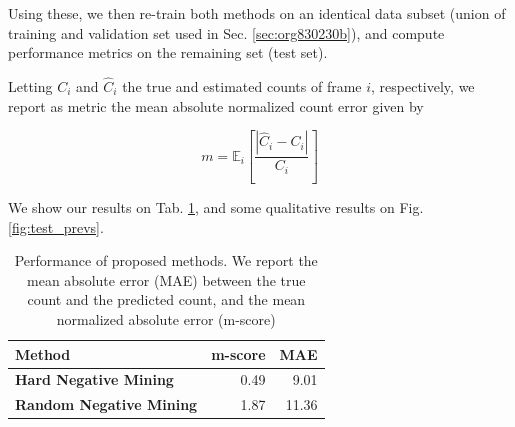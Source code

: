 \documentclass[11pt]{article}
\begin{document}
Using these, we then re-train both methods on an identical data subset (union of training and validation set used in Sec. \ref{sec:org830230b}), and compute performance metrics on the remaining set (test set).

Letting \(C_i\) and \(\hat{C}_i\) the true and estimated counts of frame \(i\), respectively, we report as metric the mean absolute normalized count error given by

\[
m = \mathbb{E}_i \left[ \frac{|\hat{C}_i - C_i|}{C_i} \right]
\]

We show our results on Tab. \ref{tab:orgf590483}, and some qualitative results on Fig. \ref{fig:test_prevs}.

\begin{table}[htbp]
\centering
\begin{tabular}{lrr}
Method & m-score & MAE\\
\hline
\textbf{Hard Negative Mining} & 0.49 & 9.01\\
\textbf{Random Negative Mining} & 1.87 & 11.36\\
\end{tabular}
\caption{\label{tab:orgf590483}Performance of proposed methods. We report the mean absolute error (MAE) between the true count and the predicted count, and the mean normalized absolute error (m-score)}

\end{table}
\end{document}
